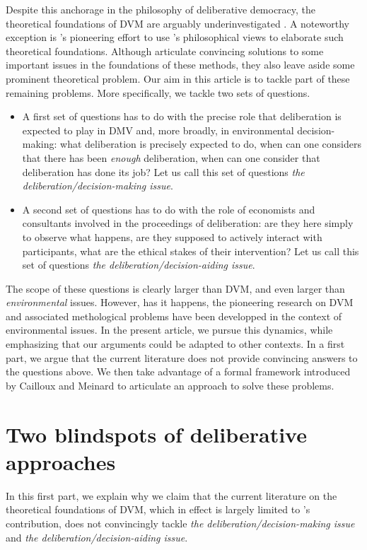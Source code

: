 \documentclass[version=3.21, pagesize, twoside=off, bibliography=totoc, DIV=calc, fontsize=12pt, a4paper, french, english]{scrartcl}
\begin{document}
Despite this anchorage in the philosophy of deliberative democracy, the theoretical foundations of DVM are arguably underinvestigated \citep{bartkowski_economic_2017,bartkowski_beyond_2018,bunse_what_2015,kenter_what_2015}. A noteworthy exception is \citet{bartkowski_beyond_2018}'s pioneering effort to use \citet{sen_idea_2009}'s philosophical views to elaborate such theoretical foundations. Although \citet{bartkowski_beyond_2018} articulate convincing solutions to some important issues in the foundations of these methods, they also leave aside some prominent theoretical problem. Our aim in this article is to tackle part of these remaining problems. More specifically, we tackle two sets of questions.
\begin{itemize}
\item A first set of questions has to do with the precise role that deliberation is expected to play in DMV and, more broadly, in environmental decision-making: what deliberation is precisely expected to do, when can one considers that there has been \emph{enough} deliberation, when can one consider that deliberation has done its job? Let us call this set of questions \emph{the deliberation/decision-making issue}.
\item A second set of questions has to do with the role of economists and consultants involved in the proceedings of deliberation: are they here simply to observe what happens, are they supposed to actively interact with participants, what are the ethical stakes of their intervention? Let us call this set of questions \emph{the deliberation/decision-aiding issue}.
\end{itemize}
The scope of these questions is clearly larger than DVM, and even larger than \emph{environmental} issues. However, has it happens, the pioneering research on DVM and associated methological problems have been developped in the context of environmental issues. In the present article, we pursue this dynamics, while emphasizing that our arguments could be adapted to other contexts.
In a first part, we argue that the current literature does not provide convincing answers to the questions above. We then take advantage of a formal framework introduced by Cailloux and Meinard to articulate an approach to solve these problems.

\section{Two blindspots of deliberative approaches}
In this first part, we explain why we claim that the current literature on the theoretical foundations of DVM, which in effect is largely limited to \citet{bartkowski_beyond_2018}'s contribution, does not convincingly tackle \emph{the deliberation/decision-making issue} and \emph{the deliberation/decision-aiding issue}.
\end{document}
